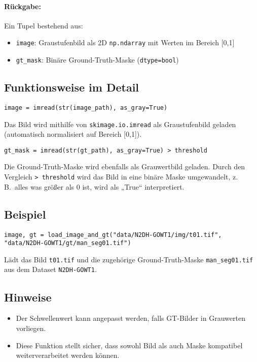 \documentclass[a4paper,12pt]{article}
\begin{document}
\paragraph{Rückgabe:}
Ein Tupel bestehend aus:
\begin{itemize}
  \item \texttt{image}: Graustufenbild als 2D \texttt{np.ndarray} mit Werten im Bereich [0,1]
  \item \texttt{gt\_mask}: Binäre Ground-Truth-Maske (\texttt{dtype=bool})
\end{itemize}

\subsection*{Funktionsweise im Detail}

\begin{verbatim}
image = imread(str(image_path), as_gray=True)
\end{verbatim}

Das Bild wird mithilfe von \texttt{skimage.io.imread} als Graustufenbild geladen (automatisch normalisiert auf Bereich [0,1]).

\begin{verbatim}
gt_mask = imread(str(gt_path), as_gray=True) > threshold
\end{verbatim}

Die Ground-Truth-Maske wird ebenfalls als Grauwertbild geladen. Durch den Vergleich \texttt{> threshold} wird das Bild in eine binäre Maske umgewandelt, z.\,B.\ alles was größer als 0 ist, wird als „True“ interpretiert.

\subsection*{Beispiel}

\begin{verbatim}
image, gt = load_image_and_gt("data/N2DH-GOWT1/img/t01.tif", "data/N2DH-GOWT1/gt/man_seg01.tif")
\end{verbatim}

Lädt das Bild \texttt{t01.tif} und die zugehörige Ground-Truth-Maske \texttt{man\_seg01.tif} aus dem Dataset \texttt{N2DH-GOWT1}.

\subsection*{Hinweise}

\begin{itemize}
  \item Der Schwellenwert kann angepasst werden, falls GT-Bilder in Grauwerten vorliegen.
  \item Diese Funktion stellt sicher, dass sowohl Bild als auch Maske kompatibel weiterverarbeitet werden können.
\end{itemize}
\end{document}
